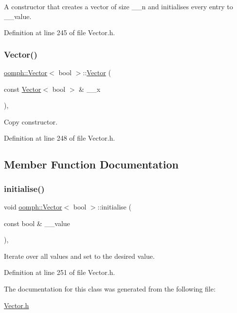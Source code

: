 A constructor that creates a vector of size \+\_\+\+\_\+n and initialises every entry to \+\_\+\+\_\+value. 



Definition at line 245 of file Vector.\+h.

\mbox{\label{classoomph_1_1Vector_3_01bool_01_4_acd294c9e1af5c2a61af05d55f03c1800}} 
\subsubsection{\texorpdfstring{Vector()}{Vector()}\hspace{0.1cm}{\footnotesize\ttfamily [5/5]}}
{\footnotesize\ttfamily \hyperlink{classoomph_1_1Vector}{oomph\+::\+Vector}$<$ bool $>$\+::\hyperlink{classoomph_1_1Vector}{Vector} (\begin{DoxyParamCaption}\item[{const \hyperlink{classoomph_1_1Vector}{Vector}$<$ bool $>$ \&}]{\+\_\+\+\_\+x }\end{DoxyParamCaption})\hspace{0.3cm}{\ttfamily [inline]}, {\ttfamily [private]}}



Copy constructor. 



Definition at line 248 of file Vector.\+h.



\subsection{Member Function Documentation}
\mbox{\label{classoomph_1_1Vector_3_01bool_01_4_a8b7fa962119d12a28ae56ff10ebfe301}} 
\subsubsection{\texorpdfstring{initialise()}{initialise()}}
{\footnotesize\ttfamily void \hyperlink{classoomph_1_1Vector}{oomph\+::\+Vector}$<$ bool $>$\+::initialise (\begin{DoxyParamCaption}\item[{const bool \&}]{\+\_\+\+\_\+value }\end{DoxyParamCaption})\hspace{0.3cm}{\ttfamily [inline]}, {\ttfamily [private]}}



Iterate over all values and set to the desired value. 



Definition at line 251 of file Vector.\+h.



The documentation for this class was generated from the following file\+:\begin{DoxyCompactItemize}
\item 
\hyperlink{Vector_8h}{Vector.\+h}\end{DoxyCompactItemize}
